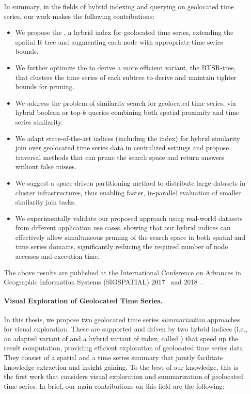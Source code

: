 In summary, in the fields of hybrid indexing and querying on geolocated time series, our work makes the following contributions:

\begin{itemize}
 \item We propose the \tsr, a hybrid index for geolocated time series, extending the spatial R-tree and augmenting each node with appropriate time series bounds.
 \item We further optimize the \tsr to derive a more efficient variant, the BTSR-tree, that clusters the time series of each subtree to derive and maintain tighter bounds for pruning.
 \item We address the problem of similarity search for geolocated time series, via hybrid boolean or top-$k$ queries combining both spatial proximity and time series similarity.
 \item We adapt state-of-the-art indices (including the \btsr index) for hybrid similarity join over geolocated time series data in centralized settings and propose traversal methods that can prune the search space and return answers without false misses.
 \item We suggest a space-driven partitioning method to distribute large datasets in cluster infrastructures, thus enabling faster, in-parallel evaluation of smaller similarity join tasks.
 \item We experimentally validate our proposed approach using real-world datasets from different application use cases, showing that our hybrid indices can effectively allow simultaneous pruning of the search space in both spatial and time series domains, significantly reducing the required number of node accesses and execution time.
\end{itemize}

The above results are published at the International Conference on Advances in Geographic Information Systems (SIGSPATIAL) 2017~\cite{chatzig17btsr} and 2018~\cite{chatzigeorgakidis2018scalable}.

\paragraph{Visual Exploration of Geolocated Time Series.} In this thesis, we propose two geolocated time series \textit{summarization} approaches for visual exploration. These are supported and driven by two hybrid indices (i.e., an adapted variant of \btsr and a hybrid variant of \isax index, called \textit{\hisax}) that speed up the result computation, providing efficient exploration of geolocated time series data. They consist of a spatial and a time series summary that jointly facilitate knowledge extraction and insight gaining. To the best of our knowledge, this is the first work that considers visual exploration and summarization of geolocated time series. In brief, our main contributions on this field are the following:

